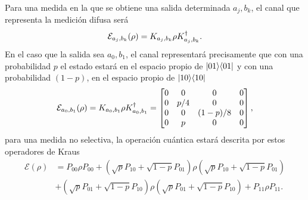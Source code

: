 Para una medida en la que se obtiene una salida determinada $a_j,b_k$, el canal que representa la medición difusa será \[\mathcal{E}_{a_j,b_k}(\rho)=K_{a_j,b_k}\rho K_{a_j,b_k}^\dagger.\] En el caso que la salida sea $a_0,b_1$, el canal representará precisamente que con una probabilidad $p$ el estado estará en el espacio propio de $|01\rangle \langle 01|$ y con una probabilidad $(1-p)$, en el espacio propio de $|10\rangle \langle10|$
\[\mathcal{E}_{a_0,b_1}(\rho)=K_{a_0,b_1}\rho K_{a_0,b_1}^\dagger=\begin{bmatrix}
    0&0&0&0\\
    0&p/4&0&0\\
    0&0&(1-p)/8&0\\
    0&p&0&0\\
\end{bmatrix},\]
para una medida no selectiva, la operación cuántica estará descrita por estos operadores de Kraus \[
\begin{split}
    \mathcal{E}(\rho)&=  P_{00}\rho P_{00}+(\sqrt{p}P_{10}+\sqrt{1-p}P_{01})\rho(\sqrt{p}P_{10}+\sqrt{1-p}P_{01})\\
    &+ (\sqrt{p}P_{01}+\sqrt{1-p}P_{10})\rho (\sqrt{p} P_{01}+\sqrt{1-p}P_{10})+P_{11}\rho P_{11}.\\
\end{split}
\]




